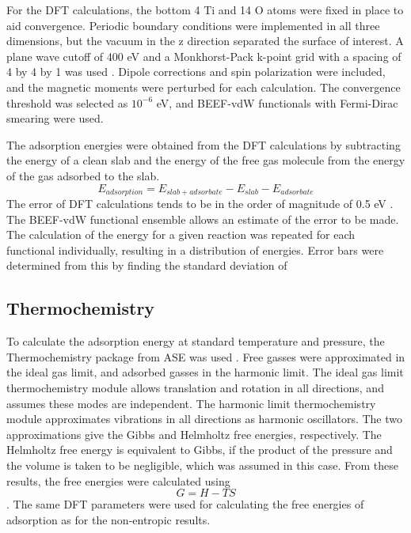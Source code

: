 \documentclass[catalysts,article,submit,moreauthors,pdftex,10pt,a4paper]{mdpi}
\theoremstyle{mdpi}
\newcounter{re}
\theoremstyle{mdpidefinition}
\begin{document}
For the DFT calculations, the bottom 4 Ti and 14 O atoms were fixed in place to aid convergence. Periodic boundary conditions were implemented in all three dimensions, but the vacuum in the z direction separated the surface of interest. A plane wave cutoff of 400 eV and a Monkhorst-Pack k-point grid with a spacing of 4 by 4 by 1 was used \cite{Monkhorst_1976}. Dipole corrections and spin polarization were included, and the magnetic moments were perturbed for each calculation. The convergence threshold was selected as $10^{-6}$ eV, and BEEF-vdW functionals \cite{Wellendorff_2012} with Fermi-Dirac smearing were used.

The adsorption energies were obtained from the DFT calculations by subtracting the energy of a clean slab and the energy of the free gas molecule from the energy of the gas adsorbed to the slab.
\begin{equation}
E_{adsorption} = E_{slab+adsorbate} - E_{slab} - E_{adsorbate}
\end{equation}
The error of DFT calculations tends to be in the order of magnitude of 0.5 eV \cite{Gautier_2015}. The BEEF-vdW functional ensemble allows an estimate of the error to be made. The calculation of the energy for a given reaction was repeated for each functional individually, resulting in a distribution of energies. Error bars were determined from this by finding the standard deviation of 

\subsection{Thermochemistry}
\cite{ase-paper,Reuter_2005}

To calculate the adsorption energy at standard temperature and pressure, the Thermochemistry package from ASE was used \cite{ase-paper}. Free gasses were approximated in the ideal gas limit, and adsorbed gasses in the harmonic limit. The ideal gas limit thermochemistry module allows translation and rotation in all directions, and assumes these modes are independent. The harmonic limit thermochemistry module approximates vibrations in all directions as harmonic oscillators. The two approximations give the Gibbs and Helmholtz free energies, respectively. The Helmholtz free energy is equivalent to Gibbs, if the product of the pressure and the volume is taken to be negligible, which was assumed in this case. From these results, the free energies were calculated using \begin{equation}
    G=H-TS
\end{equation}. The same DFT parameters were used for calculating the free energies of adsorption as for the non-entropic results.
\end{document}
